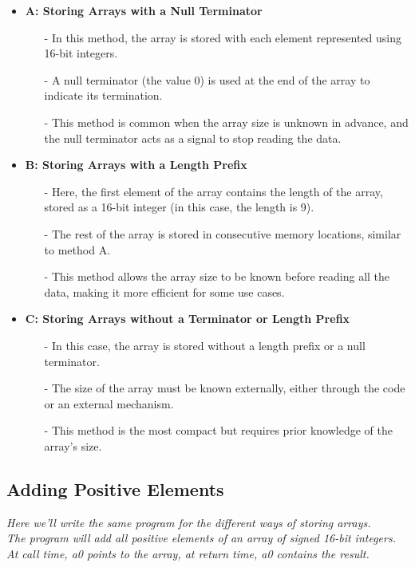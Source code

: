 \begin{itemize}
\item \textbf{A: Storing Arrays with a Null Terminator}
\begin{itemize}
    \item[-] In this method, the array is stored with each element represented using 16-bit integers.
    \item[-] A null terminator (the value 0) is used at the end of the array to indicate its termination.
    \item[-] This method is common when the array size is unknown in advance, and the null terminator acts as a signal to stop reading the data.
\end{itemize}

\item \textbf{B: Storing Arrays with a Length Prefix}
\begin{itemize}
    \item[-] Here, the first element of the array contains the length of the array, stored as a 16-bit integer (in this case, the length is 9).
    \item[-] The rest of the array is stored in consecutive memory locations, similar to method A.
    \item[-] This method allows the array size to be known before reading all the data, making it more efficient for some use cases.
\end{itemize}

\item \textbf{C: Storing Arrays without a Terminator or Length Prefix}
\begin{itemize}
    \item[-] In this case, the array is stored without a length prefix or a null terminator.
    \item[-] The size of the array must be known externally, either through the code or an external mechanism.
    \item[-] This method is the most compact but requires prior knowledge of the array's size.
\end{itemize}
\end{itemize}

\subsection{Adding Positive Elements}
\textit{Here we'll write the same program for the different ways of storing arrays.} \\
\textit{The program will add all positive elements of an array of signed 16-bit integers. At call time, a0 points to the array, at return time, a0 contains the result.} \\

